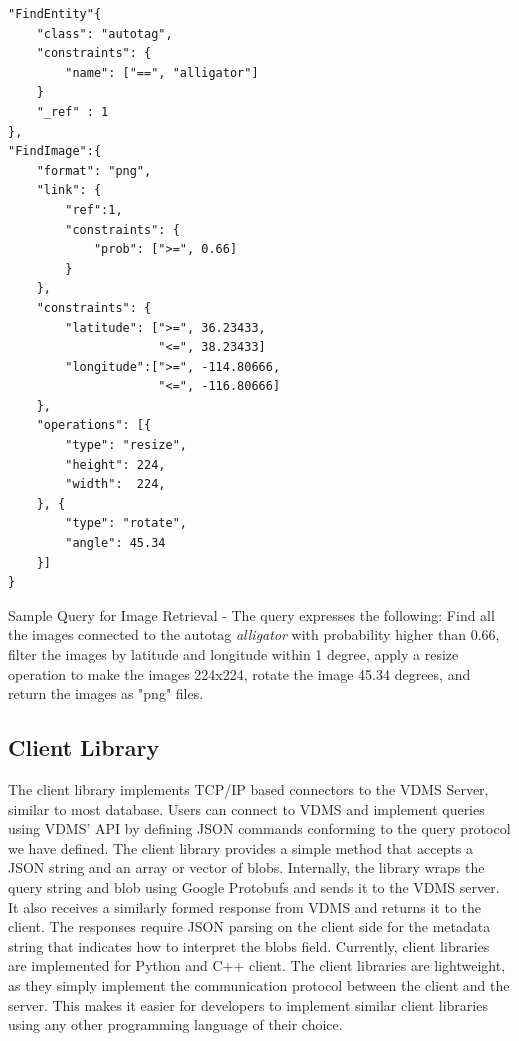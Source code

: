 \begin{listing}[ht!]
\begin{verbatim}
"FindEntity"{     
    "class": "autotag",
    "constraints": { 
        "name": ["==", "alligator"]
    }
    "_ref" : 1
},
"FindImage":{
    "format": "png",
    "link": {
        "ref":1,
        "constraints": {
            "prob": [">=", 0.66]
        }
    }, 
    "constraints": {
        "latitude": [">=", 36.23433, 
                     "<=", 38.23433]
        "longitude":[">=", -114.80666, 
                     "<=", -116.80666]
    },
    "operations": [{
        "type": "resize",
        "height": 224,
        "width":  224,
    }, {
        "type": "rotate",
        "angle": 45.34
    }]
}

\end{verbatim}
\caption{Sample Query for Image Retrieval - 
The query expresses the following: 
Find all the images connected to the autotag \textit{alligator} 
with probability higher than 0.66, 
filter the images by latitude and longitude within 1 degree, 
apply a resize operation to make the images 224x224, 
rotate the image 45.34 degrees, 
and return the images as "png" files.} 
\label{findimagegeo}
\end{listing}

\subsection{Client Library}

The client library implements TCP/IP based connectors to the VDMS Server, 
similar to most database\cite{memsql, mysql}.
Users can connect to VDMS and implement queries using VDMS' API 
by defining JSON commands conforming to the query protocol we have defined.
The client library provides a simple method that
accepts a JSON string and an array or vector of blobs.
Internally, the library wraps the query string and blob using
Google Protobufs \cite{protobufs} and sends it to the VDMS server.
It also receives a similarly formed response from VDMS
and returns it to the client. 
The responses require JSON parsing on the client
side for the metadata string that indicates how to interpret the blobs field.
Currently, client libraries are implemented for Python and C++ client. 
The client libraries are lightweight, as they simply implement the communication
protocol between the client and the server. 
This makes it easier for developers to implement similar client libraries using 
any other programming language of their choice. 
